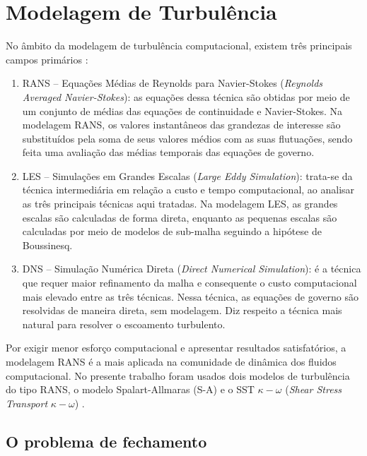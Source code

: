 \chapter{Modelagem de Turbulência}\label{cap:turbulencia}
\graphicspath{{chapter-04/img-cap04/}}

No âmbito da modelagem de turbulência computacional, existem três principais campos primários \cite{Rezende2009}:

\begin{enumerate}

    \item RANS – Equações Médias de Reynolds para Navier-Stokes (\textit{Reynolds Averaged Navier-Stokes}): as equações dessa técnica são obtidas por meio de um conjunto de médias das equações de continuidade e Navier-Stokes. Na modelagem RANS, os valores instantâneos das grandezas de interesse são substituídos pela soma de seus valores médios com as suas flutuações, sendo feita uma avaliação das médias temporais das equações de governo. 

    \item LES – Simulações em Grandes Escalas (\textit{Large Eddy Simulation}): trata-se da técnica intermediária em relação a custo e tempo computacional, ao analisar as três principais técnicas aqui tratadas. Na modelagem LES, as grandes escalas são calculadas de forma direta, enquanto as pequenas escalas são calculadas por meio de modelos de sub-malha seguindo a hipótese de Boussinesq.

    \item DNS – Simulação Numérica Direta (\textit{Direct Numerical Simulation}): é a técnica que requer maior refinamento da malha e consequente o custo computacional mais elevado entre as três técnicas. Nessa técnica, as equações de governo são resolvidas de maneira direta, sem modelagem. Diz respeito a técnica mais natural para resolver o escoamento turbulento. 
 
\end{enumerate}

Por exigir menor esforço computacional e apresentar resultados satisfatórios, a modelagem RANS é a mais aplicada na comunidade de dinâmica dos fluidos computacional. No presente trabalho foram usados dois modelos de turbulência do tipo RANS, o modelo Spalart-Allmaras (S-A) \cite{Spalart1992} e o SST \(\kappa-\omega\) (\textit{Shear Stress Transport} \(\kappa-\omega\)) \cite{Menter1994TwoequationET}. 

\section{O problema de fechamento}

